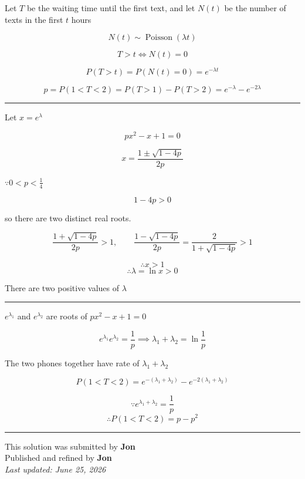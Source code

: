 \documentclass[12pt]{article}
\begin{document}
\newcommand{\ds}{\displaystyle}
Let $T$ be the waiting time until the first text, and let $N(t)$ be the number of texts in the first $t$ hours

$$N(t)\sim \operatorname{Poisson}(\lambda t)$$

$$T>t\iff N(t)=0$$

$$P(T>t)=P(N(t)=0)=e^{-\lambda t}$$

$$p=P(1<T<2)=P(T>1)-P(T>2)=e^{-\lambda}-e^{-2\lambda}$$
\bigskip\hrule\bigskip

Let $\ds x=e^\lambda$

$$px^2-x+1=0$$

$$x=\frac{1\pm\sqrt{1-4p}}{2p}$$

$\because 0<p<\frac14$

$$1-4p>0$$

so there are two distinct real roots.

$$\frac{1+\sqrt{1-4p}}{2p}>1,\qquad \frac{1-\sqrt{1-4p}}{2p}=\frac{2}{1+\sqrt{1-4p}}>1$$

$$\therefore x>1$$
$$\therefore \lambda=\ln x>0$$

There are two positive values of $\lambda$

\bigskip\hrule\bigskip

$e^{\lambda_1}$ and $e^{\lambda_2}$ are roots of $px^2-x+1=0$

$$e^{\lambda_1}e^{\lambda_2}=\frac1p\implies \lambda_1+\lambda_2=\ln\frac1p$$

The two phones together have rate of $\lambda_1+\lambda_2$

$$P(1<T<2)=e^{-(\lambda_1+\lambda_2)}-e^{-2(\lambda_1+\lambda_2)}$$

$$\because e^{\lambda_1+\lambda_2}=\frac1p$$
$$\therefore \boxed{P(1<T<2)=p-p^2}$$

\bigskip
\hrule
\begin{center}
    This solution was submitted by \textbf{Jon}\\[4pt]
    Published and refined by \textbf{Jon}\\[8pt]
    \textit{Last updated: June 25, 2026}
\end{center}
\end{document}
